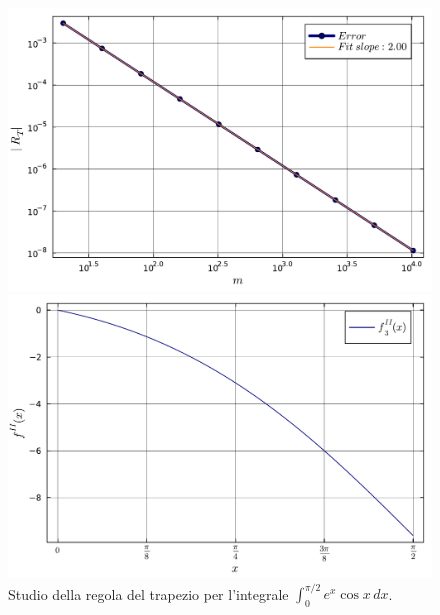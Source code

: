 \documentclass[letterpaper, 12pt]{article}
\numberwithin{equation}{section}    %
\begin{document}
\begin{figure}[!ht]
    \centering
    \begin{minipage}[b]{0.47\textwidth}
        \includegraphics[width=\textwidth]{5123.pdf}
    \end{minipage}
    \hspace{0.5cm}
    \begin{minipage}[b]{0.47\textwidth}
        \includegraphics[width=\textwidth]{5123_2.pdf}
    \end{minipage}
    \caption{Studio della regola del trapezio per l'integrale $\int_0^{\pi/2}e^x \cos x\, dx$.}
    \label{fig:es5_1_2_3}
\end{figure}
\end{document}
